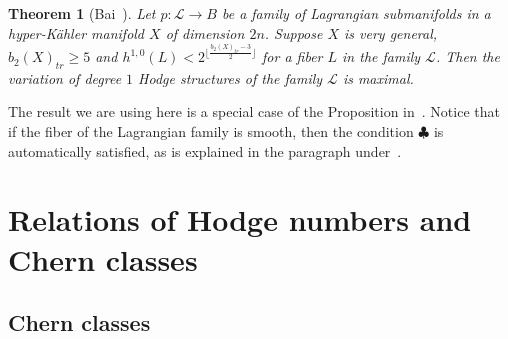 \documentclass{article}
\newtheorem{theorem}{Theorem}[section]
\newtheorem{lemma}[theorem]{Lemma}
\theoremstyle{definition}
\begin{document}
\begin{theorem}[Bai~\cite{Bai}]
    Let $p: \mathcal L\to B$ be a family of Lagrangian submanifolds in a hyper-Kähler manifold $X$ of dimension $2n$. Suppose $X$ is very general, $b_2(X)_{tr} \geq 5$ and $h^{1, 0}(L) < 2^{ \lfloor \frac{b_2(X)_{tr} - 3}{2}\rfloor} $ for a fiber $L$ in the family $\mathcal L$. Then the variation of degree $1$ Hodge structures of the family $\mathcal L$ is maximal.
\end{theorem}

The result we are using here is a special case of the Proposition in~\cite{Bai}. Notice that if the fiber of the Lagrangian family is smooth, then the condition $\clubsuit$ is automatically satisfied, as is explained in the paragraph under~\cite[Proposition 1]{Bai}.



\section{Relations of Hodge numbers and Chern classes}

\subsection{Chern classes}\label{SubsectionChernClasses}
\end{document}

